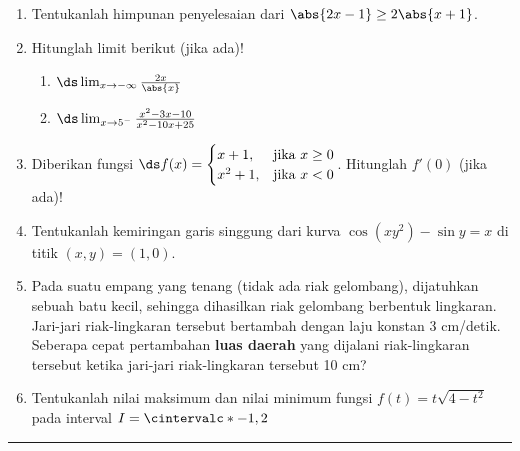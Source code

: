 \begin{enumerate}[leftmargin=*, label={\arabic*}.]
\item Tentukanlah himpunan penyelesaian dari $\abs{2x-1} \geq 2\abs{x+1}$.
\item Hitunglah limit berikut (jika ada)!
    \begin{enumerate}[label={\alph*}.]
        \item $\ds \lim_{x\to -\infty} \frac{2x}{\abs{x}}$
        \item $\ds \lim_{x\to 5^{-}} \frac{x^{2}-3x-10}{x^{2}-10x+25}$
    \end{enumerate}
\item Diberikan fungsi 
$\ds
    f(x) = 
    \begin{cases}
        x+1, &\text{jika $x \geq 0$}\\
        x^{2}+1, &\text{jika $x < 0$}
    \end{cases}
$. Hitunglah $f'(0)$ (jika ada)!
\item Tentukanlah kemiringan garis singgung dari kurva $\cos (xy^{2})-\sin y = x$ 
di titik $(x,y) = (1,0)$.
\item Pada suatu empang yang tenang (tidak ada riak gelombang), dijatuhkan sebuah 
batu kecil, sehingga dihasilkan riak gelombang berbentuk lingkaran. Jari-jari 
riak-lingkaran tersebut bertambah dengan laju konstan 3 cm/detik. Seberapa cepat 
pertambahan \textbf{luas daerah} yang dijalani riak-lingkaran tersebut ketika 
jari-jari riak-lingkaran tersebut 10 cm?
\item Tentukanlah nilai maksimum dan nilai minimum fungsi $f(t)=t\sqrt{4-t^{2}}$ 
pada interval $I = \cintervalc*{-1,2}$
\end{enumerate}
\vspace{0.2cm}
\hrule height 1pt

